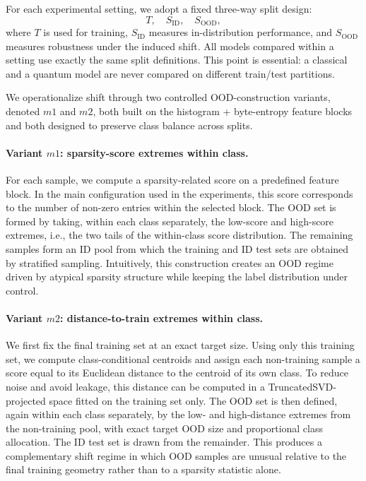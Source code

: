 \documentclass[pdflatex,sn-mathphys-num]{sn-jnl}%
\theoremstyle{thmstyleone}%
\theoremstyle{thmstyletwo}%
\theoremstyle{thmstylethree}%
\begin{document}
For each experimental setting, we adopt a fixed three-way split design:
\[
T,\quad S_{\mathrm{ID}},\quad S_{\mathrm{OOD}},
\]
where $T$ is used for training, $S_{\mathrm{ID}}$ measures in-distribution performance, and $S_{\mathrm{OOD}}$ measures robustness under the induced shift. All models compared within a setting use exactly the same split definitions. This point is essential: a classical and a quantum model are never compared on different train/test partitions.

We operationalize shift through two controlled OOD-construction variants, denoted $m1$ and $m2$, both built on the histogram + byte-entropy feature blocks and both designed to preserve class balance across splits.

\paragraph{Variant $m1$: sparsity-score extremes within class.}
For each sample, we compute a sparsity-related score on a predefined feature block. In the main configuration used in the experiments, this score corresponds to the number of non-zero entries within the selected block. The OOD set is formed by taking, within each class separately, the low-score and high-score extremes, i.e., the two tails of the within-class score distribution. The remaining samples form an ID pool from which the training and ID test sets are obtained by stratified sampling. Intuitively, this construction creates an OOD regime driven by atypical sparsity structure while keeping the label distribution under control.

\paragraph{Variant $m2$: distance-to-train extremes within class.}
We first fix the final training set at an exact target size. Using only this training set, we compute class-conditional centroids and assign each non-training sample a score equal to its Euclidean distance to the centroid of its own class. To reduce noise and avoid leakage, this distance can be computed in a TruncatedSVD-projected space fitted on the training set only. The OOD set is then defined, again within each class separately, by the low- and high-distance extremes from the non-training pool, with exact target OOD size and proportional class allocation. The ID test set is drawn from the remainder. This produces a complementary shift regime in which OOD samples are unusual relative to the final training geometry rather than to a sparsity statistic alone.
\end{document}
